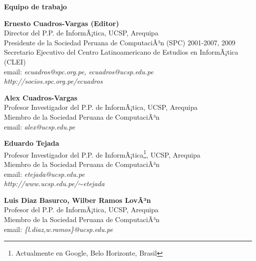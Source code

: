 \begin{center}
{\bf \Huge Equipo de trabajo}
\end{center}
\vspace{1cm}

\begin{center}
\textbf{Ernesto Cuadros-Vargas (Editor)}\\
Director del P.P. de InformÃ¡tica, UCSP, Arequipa\\ %
Presidente de la Sociedad Peruana de ComputaciÃ³n (SPC) 2001-2007, 2009\\
Secretario Ejecutivo del Centro Latinoamericano de Estudios en InformÃ¡tica (CLEI)\\
email: \textit{ecuadros@spc.org.pe, ecuadros@ucsp.edu.pe}\\
\textit{http://socios.spc.org.pe/ecuadros}
\end{center}

\begin{center}
\textbf{Alex Cuadros-Vargas}\\
Profesor Investigador del P.P. de InformÃ¡tica, UCSP, Arequipa\\
Miembro de la Sociedad Peruana de ComputaciÃ³n\\
email: \textit{alex@ucsp.edu.pe}\\
\end{center}

\begin{center}
\textbf{Eduardo Tejada}\\
Profesor Investigador del P.P. de InformÃ¡tica\footnote{Actualmente en Google, Belo Horizonte, Brasil}, UCSP, Arequipa\\
Miembro de la Sociedad Peruana de ComputaciÃ³n\\
email: \textit{etejada@ucsp.edu.pe}\\
\textit{http://www.ucsp.edu.pe/$\sim$etejada}
\end{center}

\begin{center}
\textbf{Luis Diaz Basurco, Wilber Ramos LovÃ³n}\\
Profesor del P.P. de InformÃ¡tica, UCSP, Arequipa\\
Miembro de la Sociedad Peruana de ComputaciÃ³n\\
email: \textit{\{l.diaz,w.ramos\}@ucsp.edu.pe}
\end{center}

